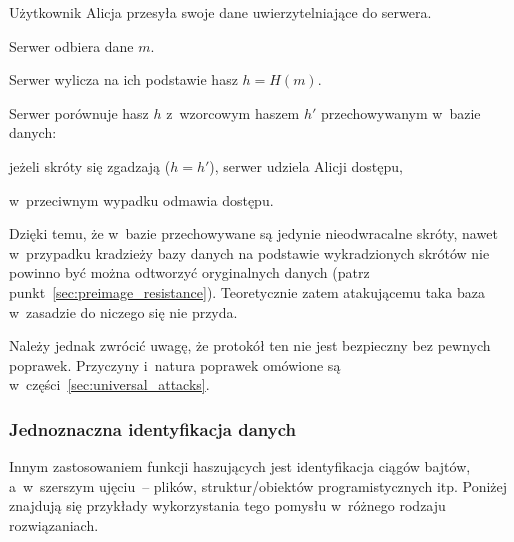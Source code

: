 \label{sec:secure_pasword_storage}
\begin{myenumerate}

    \item Użytkownik Alicja przesyła swoje dane uwierzytelniające do serwera.

    \item Serwer odbiera dane $m$.

    \item Serwer wylicza na ich podstawie hasz $h = H(m)$.

    \item Serwer porównuje hasz $h$ z~wzorcowym haszem $h'$ przechowywanym
    w~bazie danych:

    \begin{myenumerate}

        \item jeżeli skróty się zgadzają ($h = h'$), serwer udziela Alicji
        dostępu,

        \item w~przeciwnym wypadku odmawia dostępu.

    \end{myenumerate}

\end{myenumerate}

Dzięki temu, że w~bazie przechowywane są jedynie nieodwracalne skróty, nawet
w~przypadku kradzieży bazy danych na podstawie wykradzionych skrótów nie
powinno być można odtworzyć oryginalnych danych (patrz
punkt~\ref{sec:preimage_resistance}). Teoretycznie zatem atakującemu taka baza
w~zasadzie do niczego się nie przyda.

Należy jednak zwrócić uwagę, że protokół ten nie jest bezpieczny bez pewnych
poprawek. Przyczyny i~natura poprawek omówione są
w~części~\ref{sec:universal_attacks}.



\subsubsection{Jednoznaczna identyfikacja danych}
Innym zastosowaniem funkcji haszujących jest identyfikacja ciągów bajtów,
a~w~szerszym ujęciu~-- plików, struktur/obiektów programistycznych itp. Poniżej
znajdują się przykłady wykorzystania tego pomysłu w~różnego rodzaju
rozwiązaniach.

